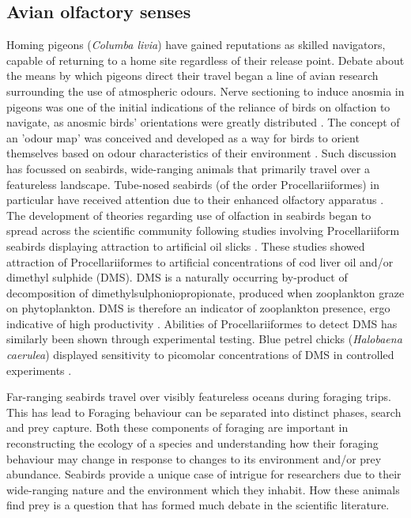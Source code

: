\documentclass[9pt,twocolumn,twoside,lineno]{pnas-new}
\begin{document}
\subsection{Avian olfactory senses}
Homing pigeons (\textit{Columba livia}) have gained reputations as skilled navigators, capable of returning to a home site regardless of their release point. Debate about the means by which pigeons direct their travel began a line of avian research surrounding the use of atmospheric odours. Nerve sectioning to induce anosmia in pigeons was one of the initial indications of the reliance of birds on olfaction to navigate, as anosmic birds' orientations were greatly distributed \citep{Papi_1972}. The concept of an 'odour map' was conceived and developed as a way for birds to orient themselves based on odour characteristics of their environment \citep{Papi_1972,Bonadonna_2003}. Such discussion has focussed on seabirds, wide-ranging animals that primarily travel over a featureless landscape. Tube-nosed seabirds (of the order Procellariiformes) in particular have received attention due to their enhanced olfactory apparatus \citep{Bang_1960, Bang_1971, Jacobs_2012}. The development of theories regarding use of olfaction in seabirds began to spread across the scientific community following studies involving Procellariiform seabirds displaying attraction to artificial oil slicks \citep{Grubb_1972,Dell_Ariccia_2014,Nevitt_1995,Nevitt_1999,Nevitt_2000}. These studies showed attraction of Procellariiformes to artificial concentrations of cod liver oil and/or dimethyl sulphide (DMS). DMS is a naturally occurring by-product of decomposition of dimethylsulphoniopropionate, produced when zooplankton graze on phytoplankton. DMS is therefore an indicator of zooplankton presence, ergo indicative of high productivity \citep{Cantin_1996,Dacey_1986,Jean_2009,Sim__2001}. Abilities of Procellariiformes to detect DMS has similarly been shown through experimental testing. Blue petrel chicks (\textit{Halobaena caerulea}) displayed sensitivity to picomolar concentrations of DMS in controlled experiments \citep{Bonadonna_2006}.




Far-ranging seabirds travel over visibly featureless oceans during foraging trips. This has lead to 
Foraging behaviour can be separated into distinct phases, search and prey capture. Both these components of foraging are important in reconstructing the ecology of a species and understanding how their foraging behaviour may change in response to changes to its environment and/or prey abundance. Seabirds provide a unique case of intrigue for researchers due to their wide-ranging nature and the environment which they inhabit. How these animals find prey is a question that has formed much debate in the scientific literature.
\end{document}

